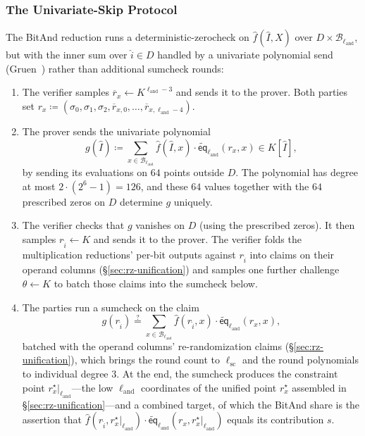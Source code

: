 \documentclass{article}
\theoremstyle{definition}
\newcommand*{\mle}{\widetilde}
\newcommand{\eq}{\mathsf{eq}}
\newcommand{\BB}{\mathcal{B}}
\begin{document}
\subsubsection{The Univariate-Skip Protocol}
\label{sec:univariate-skip}

The BitAnd reduction runs a deterministic-zerocheck on $\widehat{f}(\widehat{I}, X)$ over $D \times \BB_{\ell_\text{and}}$, but with the inner sum over $\widehat{i} \in D$ handled by a univariate polynomial send (Gruen~\cite[\S 5.1]{Gruen:2024aa}) rather than additional sumcheck rounds:

\begin{enumerate}
\item The verifier samples $\overline{r}_x \gets K^{\ell_\text{and} - 3}$ and sends it to the prover. Both parties set $r_x \coloneqq (\sigma_0, \sigma_1, \sigma_2, \overline{r}_{x, 0}, \ldots, \overline{r}_{x, \ell_\text{and} - 4})$.
\item The prover sends the univariate polynomial
  \[
    g(\widehat{I}) \coloneqq \sum_{x \in \BB_{\ell_\text{and}}} \widehat{f}(\widehat{I}, x) \cdot \mle{\eq}_{\ell_\text{and}}(r_x, x) \in K[\widehat{I}],
  \]
  by sending its evaluations on $64$ points outside $D$. The polynomial has degree at most $2 \cdot (2^6 - 1) = 126$, and these $64$ values together with the $64$ prescribed zeros on $D$ determine $g$ uniquely.
\item The verifier checks that $g$ vanishes on $D$ (using the prescribed zeros). It then samples $r_{\widehat{i}} \gets K$ and sends it to the prover. The verifier folds the multiplication reductions' per-bit outputs against $r_{\widehat{i}}$ into claims on their operand columns (\S\ref{sec:rz-unification}) and samples one further challenge $\theta \gets K$ to batch those claims into the sumcheck below.
\item The parties run a sumcheck on the claim
  \[
    g(r_{\widehat{i}}) \stackrel{?}{=} \sum_{x \in \BB_{\ell_\text{and}}} \widehat{f}(r_{\widehat{i}}, x) \cdot \mle{\eq}_{\ell_\text{and}}(r_x, x),
  \]
  batched with the operand columns' re-randomization claims (\S\ref{sec:rz-unification}), which brings the round count to $\ell_\text{sc}$ and the round polynomials to individual degree $3$. At the end, the sumcheck produces the constraint point $r^\star_x|_{\ell_\text{and}}$---the low $\ell_\text{and}$ coordinates of the unified point $r^\star_x$ assembled in \S\ref{sec:rz-unification}---and a combined target, of which the BitAnd share is the assertion that $\widehat{f}(r_{\widehat{i}}, r^\star_x|_{\ell_\text{and}}) \cdot \mle{\eq}_{\ell_\text{and}}(r_x, r^\star_x|_{\ell_\text{and}})$ equals its contribution $s$.

\end{enumerate}
\end{document}
